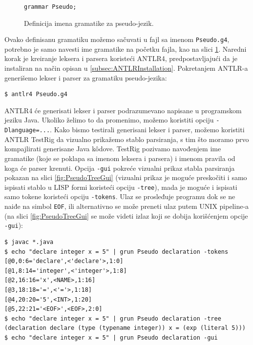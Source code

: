\begin{figure}[h!]
\begin{lstlisting}[language={}]
grammar Pseudo;
\end{lstlisting}
\caption{Definicija imena gramatike za pseudo-jezik.}
\label{fig:PseudoDef9}
\end{figure}

Ovako definisanu gramatiku možemo sačuvati u fajl sa imenom \texttt{Pseudo.g4}, potrebno je samo navesti ime gramatike na početku fajla, kao na slici \ref{fig:PseudoDef9}. Naredni korak je kreiranje leksera i parsera koristeći ANTLR4, predpostavljajući da je instaliran na način opisan u \ref{subsec:ANTLRInstallation}. Pokretanjem ANTLR-a generišemo lekser i parser za gramatiku pseudo-jezika:
\begin{lstlisting}[language={}]
$ antlr4 Pseudo.g4
\end{lstlisting}

ANTLR4 će generisati lekser i parser podrazumevano napisane u programskom jeziku Java. Ukoliko želimo to da promenimo, možemo koristiti opciju \texttt{-Dlanguage=...}. Kako bismo testirali generisani lekser i parser, možemo koristiti ANTLR TestRig da vizualno prikažemo stablo parsiranja, s tim što moramo prvo kompajlirati generisane Java k\^odove. TestRig pozivamo navođenjem ime gramatike (koje se poklapa sa imenom leksera i parsera) i imenom pravila od koga će parser krenuti. Opcija \texttt{-gui} pokreće vizualni prikaz stabla parsiranja pokazan na slici \ref{fig:PseudoTreeGui} (vizualni prikaz je moguće preskočiti i samo ispisati stablo u LISP formi koristeći opciju \texttt{-tree}), mada je moguće i ispisati samo tokene koristeći opciju \texttt{-tokens}. Ulaz se prosleđuje programu dok se ne naiđe na simbol \texttt{EOF}, ili alternativno se može preneti ulaz putem UNIX pipeline-a (na slici \ref{fig:PseudoTreeGui} se može videti izlaz koji se dobija korišćenjem opcije \texttt{-gui}):
\begin{lstlisting}[language={}]
$ javac *.java
$ echo "declare integer x = 5" | grun Pseudo declaration -tokens
[@0,0:6='declare',<'declare'>,1:0]
[@1,8:14='integer',<'integer'>,1:8]
[@2,16:16='x',<NAME>,1:16]
[@3,18:18='=',<'='>,1:18]
[@4,20:20='5',<INT>,1:20]
[@5,22:21='<EOF>',<EOF>,2:0]
$ echo "declare integer x = 5" | grun Pseudo declaration -tree
(declaration declare (type (typename integer)) x = (exp (literal 5)))
$ echo "declare integer x = 5" | grun Pseudo declaration -gui
\end{lstlisting}    

